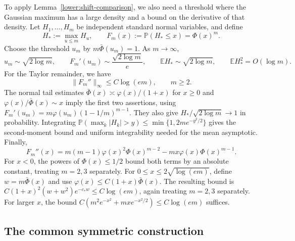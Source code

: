 \documentclass[11pt,letterpaper]{article}
\theoremstyle{remark}
\newcommand{\E}{\mathbb E}
\newcommand{\Pp}{\mathbb P}
\begin{document}
To apply Lemma~\ref{lower:shift-comparison}, we also need a threshold
where the Gaussian maximum has a large density and a bound on the
derivative of that density. Let \(H_1,\ldots,H_m\) be independent
standard normal variables, and define
\[
 H_*:=\max_{u\le m}H_u,\qquad F_m(x):=\Pp(H_*\le x)=\Phi(x)^m.
\]
Choose the threshold \(u_m\) by \(m\bar\Phi(u_m)=1\).
As \(m\to\infty\),
\begin{equation}
 u_m\sim\sqrt{2\log m},\qquad
 F_m'(u_m)\sim\frac{\sqrt{2\log m}}e,\qquad
 \E H_*\sim\sqrt{2\log m},\qquad \E H_*^2=O(\log m).
 \label{sym:eq:gaussian-max}
\end{equation}
For the Taylor remainder, we have
\begin{equation}
 \|F_m''\|_\infty\le C\log(em),\qquad m\ge2.
 \label{sym:eq:gaussian-smoothness}
\end{equation}
The normal tail estimates
\(\bar\Phi(x)\asymp\varphi(x)/(1+x)\) for \(x\ge0\) and
\(\varphi(x)/\bar\Phi(x)\sim x\) imply the first two assertions,
using \(F_m'(u_m)=m\varphi(u_m)(1-1/m)^{m-1}\).
They also give \(H_*/\sqrt{2\log m}\to1\) in probability.
Integrating \(\Pp(\max_k|H_k|>y)\le\min\{1,2me^{-y^2/2}\}\)
gives the second-moment bound and uniform integrability needed for
the mean asymptotic. Finally,
\[
 F_m''(x)=m(m-1)\varphi(x)^2\Phi(x)^{m-2}
             -mx\varphi(x)\Phi(x)^{m-1}.
\]
For \(x<0\), the powers of \(\Phi(x)\le1/2\) bound both terms
by an absolute constant, treating \(m=2,3\) separately. For
\(0\le x\le2\sqrt{\log(em)}\), {define} \(w=m\bar\Phi(x)\) and use
\(\varphi(x)\le C(1+x)\bar\Phi(x)\). The resulting bound is
\(C(1+x)^2(w+w^2)e^{-c_*w}\le C\log(em)\), again treating
\(m=2,3\) separately. For larger \(x\), the bound
\(C(m^2e^{-x^2}+mx e^{-x^2/2})\le C\log(em)\) suffices.

\subsection{The common symmetric construction}
\label{app:lower-family}
\end{document}
